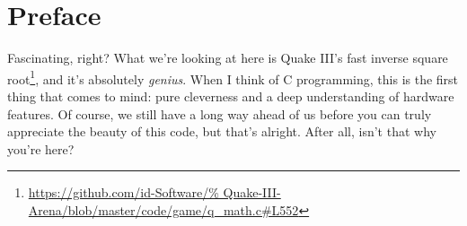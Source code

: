 %

\chapter{Preface}


\noindent
Fascinating, right?  What we're looking at here is Quake III's fast
inverse square root\footnote{\url{https://github.com/id-Software/%
Quake-III-Arena/blob/master/code/game/q_math.c\#L552}}, and it's
absolutely \emph{genius}.  When I think of C programming, this is the
first thing that comes to mind: pure cleverness and a deep understanding
of hardware features.  Of course, we still have a long way ahead of us
before you can truly appreciate the beauty of this code, but that's
alright.  After all, isn't that why you're here?

